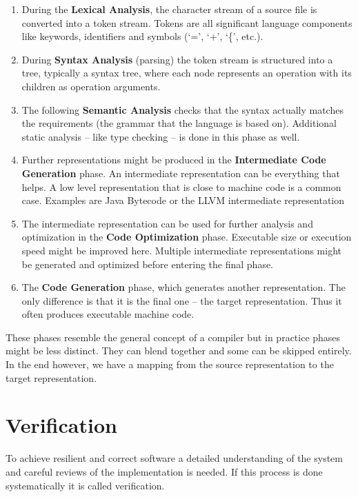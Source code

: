 \begin{enumerate}
  \item During the \textbf{Lexical Analysis}, the character stream of a source file is converted into a token stream.
  Tokens are all significant language components like keywords, identifiers and symbols (`=', `+', `\{', etc.).
  \item During \textbf{Syntax Analysis} (parsing) the token stream is structured into a tree,
  typically a syntax tree, where each node represents an operation with its children as operation arguments.
  \item The following \textbf{Semantic Analysis} checks that the syntax actually matches the requirements (the grammar that the language is based on).\newline
  Additional static analysis -- like type checking -- is done in this phase as well.
  \item Further representations might be produced in the \textbf{Intermediate Code Generation} phase.
  An intermediate representation can be everything that helps.
  A low level representation that is close to machine code is a common case.
  Examples are Java Bytecode or the LLVM intermediate representation
  \item The intermediate representation can be used for further analysis and optimization in the \textbf{Code Optimization} phase.
  Executable size or execution speed might be improved here.
  Multiple intermediate representations might be generated and optimized before entering the final phase.
  \item The \textbf{Code Generation} phase, which generates another representation.
  The only difference is that it is the final one -- the target representation.
  Thus it often produces executable machine code.
\end{enumerate}

These phases resemble the general concept of a compiler but in practice phases might be less distinct.
They can blend together and some can be skipped entirely.
In the end however, we have a mapping from the source representation to the target representation.

\section{Verification}
\label{rel_mc}
To achieve resilient and correct software a detailed understanding of the system and careful reviews of the implementation is needed.
If this process is done systematically it is called verification.


